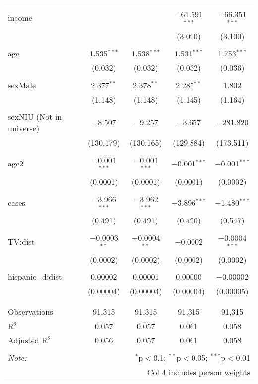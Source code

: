 \begin{table}[!htbp]
\begin{tabular}{@{\extracolsep{-5pt}}lcccc}
  & & & & \\ 
 income &  &  & $-$61.591$^{***}$ & $-$66.351$^{***}$ \\ 
  &  &  & (3.090) & (3.100) \\ 
  & & & & \\ 
 age & 1.535$^{***}$ & 1.538$^{***}$ & 1.531$^{***}$ & 1.753$^{***}$ \\ 
  & (0.032) & (0.032) & (0.032) & (0.036) \\ 
  & & & & \\ 
 sexMale & 2.377$^{**}$ & 2.378$^{**}$ & 2.285$^{**}$ & 1.802 \\ 
  & (1.148) & (1.148) & (1.145) & (1.164) \\ 
  & & & & \\ 
 sexNIU (Not in universe) & $-$8.507 & $-$9.257 & $-$3.657 & $-$281.820 \\ 
  & (130.179) & (130.165) & (129.884) & (173.511) \\ 
  & & & & \\ 
 age2 & $-$0.001$^{***}$ & $-$0.001$^{***}$ & $-$0.001$^{***}$ & $-$0.001$^{***}$ \\ 
  & (0.0001) & (0.0001) & (0.0001) & (0.0002) \\ 
  & & & & \\ 
 cases & $-$3.966$^{***}$ & $-$3.962$^{***}$ & $-$3.896$^{***}$ & $-$1.480$^{***}$ \\ 
  & (0.491) & (0.491) & (0.490) & (0.547) \\ 
  & & & & \\ 
 TV:dist & $-$0.0003$^{**}$ & $-$0.0004$^{**}$ & $-$0.0002 & $-$0.0004$^{***}$ \\ 
  & (0.0002) & (0.0002) & (0.0002) & (0.0002) \\ 
  & & & & \\ 
 hispanic\_d:dist & 0.00002 & 0.00001 & 0.00000 & $-$0.00002 \\ 
  & (0.00004) & (0.00004) & (0.00004) & (0.00005) \\ 
  & & & & \\ 
\hline \\[-1.8ex] 
Observations & 91,315 & 91,315 & 91,315 & 91,315 \\ 
R$^{2}$ & 0.057 & 0.057 & 0.061 & 0.058 \\ 
Adjusted R$^{2}$ & 0.056 & 0.057 & 0.061 & 0.058 \\ 
\hline 
\hline \\[-1.8ex] 
\textit{Note:}  & \multicolumn{4}{r}{$^{*}$p$<$0.1; $^{**}$p$<$0.05; $^{***}$p$<$0.01} \\ 
 & \multicolumn{4}{r}{Col 4 includes person weights} \\ 
\end{tabular} 
\end{table} 
